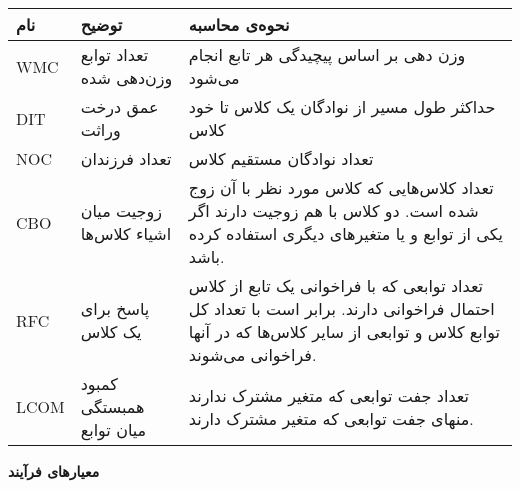 \begin{itemize}
\begin{table}[H]
\begin{tabular}{|C{2cm}|C{3cm}|C{8cm}|}
 		\hline
 		\hline
 		نام & توضیح & نحوه‌ی محاسبه \\
 		\hline
 		\hline
 		WMC &
 		تعداد توابع وزن‌دهی شده & وزن دهی بر اساس پیچیدگی هر تابع انجام می‌شود \\
 		\hline
DIT & 
عمق درخت وراثت & حداکثر طول مسیر از نوادگان یک کلاس تا خود کلاس\\
\hline
NOC &
تعداد فرزندان & تعداد نوادگان مستقیم کلاس\\
\hline
CBO & 
زوجیت میان اشیاء کلاس‌ها & تعداد کلاس‌هایی که کلاس مورد نظر با آن زوج شده است. دو کلاس با هم زوجیت دارند اگر یکی از توابع و یا متغیر‌های دیگری استفاده کرده باشد. \\
\hline
RFC &
پاسخ برای یک کلاس & تعداد توابعی که با فراخوانی یک تابع از کلاس احتمال فراخوانی دارند. برابر است با تعداد کل توابع کلاس و توابعی از سایر کلاس‌ها که در آنها فراخوانی می‌شوند. \\
\hline
LCOM & 
کمبود همبستگی میان توابع & تعداد جفت توابعی که متغیر مشترک ندارند منهای جفت توابعی که متغیر مشترک دارند. \\
 		
 		\hline

\end{tabular}
\end{table}

\end{itemize}
\textbf{معیارهای فرآیند} \\

